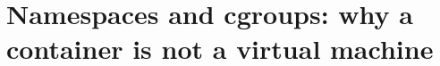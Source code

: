 \chapter{Namespaces and cgroups: why a container is not a virtual machine}
\label{ch:namespaces-and-cgroups-why-a-container}


